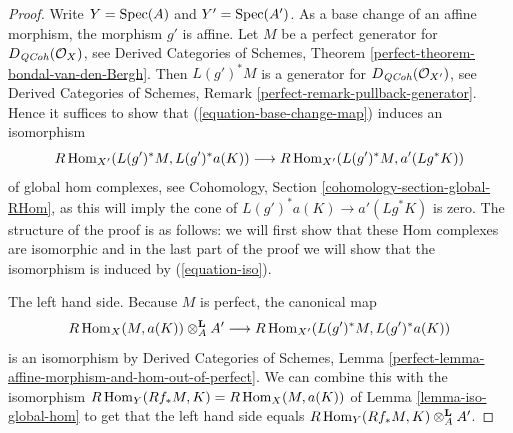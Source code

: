 \begin{proof}
Write $Y = \mathop{\mathrm{Spec}}(A)$ and $Y' = \mathop{\mathrm{Spec}}(A')$. As a base change of an affine
morphism, the morphism $g'$ is affine. Let $M$ be a perfect generator
for $D_{\mathit{QCoh}}(\mathcal{O}_X)$, see Derived Categories of Schemes, Theorem
\ref{perfect-theorem-bondal-van-den-Bergh}. Then $L(g')^*M$ is a
generator for $D_{\mathit{QCoh}}(\mathcal{O}_{X'})$, see
Derived Categories of Schemes, Remark \ref{perfect-remark-pullback-generator}.
Hence it suffices to show that (\ref{equation-base-change-map})
induces an isomorphism
\begin{equation}
\label{equation-iso}
R\mathop{\mathrm{Hom}}\nolimits_{X'}(L(g')^*M, L(g')^*a(K))
\longrightarrow
R\mathop{\mathrm{Hom}}\nolimits_{X'}(L(g')^*M, a'(Lg^*K))
\end{equation}
of global hom complexes, see
Cohomology, Section \ref{cohomology-section-global-RHom},
as this will imply the cone of $L(g')^*a(K) \to a'(Lg^*K)$
is zero.
The structure of the proof is as follows: we will first show that
these Hom complexes are isomorphic and in the last part of the proof
we will show that the isomorphism is induced by (\ref{equation-iso}).

\medskip\noindent
The left hand side. Because $M$ is perfect, the canonical map
$$
R\mathop{\mathrm{Hom}}\nolimits_X(M, a(K)) \otimes^\mathbf{L}_A A'
\longrightarrow
R\mathop{\mathrm{Hom}}\nolimits_{X'}(L(g')^*M, L(g')^*a(K))
$$
is an isomorphism by Derived Categories of Schemes, Lemma
\ref{perfect-lemma-affine-morphism-and-hom-out-of-perfect}.
We can combine this with the isomorphism
$R\mathop{\mathrm{Hom}}\nolimits_Y(Rf_*M, K) = R\mathop{\mathrm{Hom}}\nolimits_X(M, a(K))$
of Lemma \ref{lemma-iso-global-hom}
to get that the left hand side equals
$R\mathop{\mathrm{Hom}}\nolimits_Y(Rf_*M, K) \otimes^\mathbf{L}_A A'$.


\end{proof}
